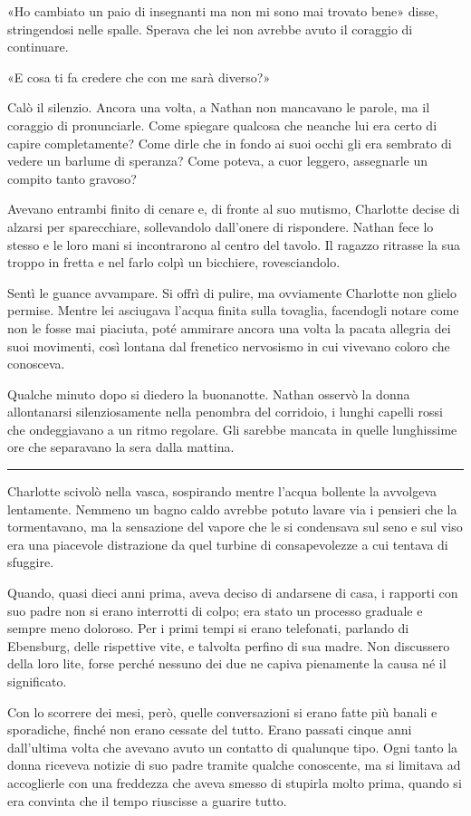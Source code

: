 «Ho cambiato un paio di insegnanti ma non mi sono mai trovato bene» disse, stringendosi nelle
spalle. Sperava che lei non avrebbe avuto il coraggio di continuare.

«E cosa ti fa credere che con me sarà diverso?»

Calò il silenzio. Ancora una volta, a Nathan non mancavano le parole, ma il coraggio di
pronunciarle. Come spiegare qualcosa che neanche lui era certo di capire completamente? Come dirle
che in fondo ai suoi occhi gli era sembrato di vedere un barlume di speranza? Come poteva, a cuor
leggero, assegnarle un compito tanto gravoso?

Avevano entrambi finito di cenare e, di fronte al suo mutismo, Charlotte decise di alzarsi per
sparecchiare, sollevandolo dall'onere di rispondere. Nathan fece lo stesso e le loro mani si
incontrarono al centro del tavolo. Il ragazzo ritrasse la sua troppo in fretta e nel farlo colpì un
bicchiere, rovesciandolo.

Sentì le guance avvampare. Si offrì di pulire, ma ovviamente Charlotte non glielo permise. Mentre
lei asciugava l'acqua finita sulla tovaglia, facendogli notare come non le fosse mai piaciuta, poté
ammirare ancora una volta la pacata allegria dei suoi movimenti, così lontana dal frenetico
nervosismo in cui vivevano coloro che conosceva.

Qualche minuto dopo si diedero la buonanotte. Nathan osservò la donna allontanarsi silenziosamente
nella penombra del corridoio, i lunghi capelli rossi che ondeggiavano a un ritmo regolare. Gli
sarebbe mancata in quelle lunghissime ore che separavano la sera dalla mattina.

\plainbreak{1}

Charlotte scivolò nella vasca, sospirando mentre l'acqua bollente la avvolgeva lentamente. Nemmeno
un bagno caldo avrebbe potuto lavare via i pensieri che la tormentavano, ma la sensazione del vapore
che le si condensava sul seno e sul viso era una piacevole distrazione da quel turbine di
consapevolezze a cui tentava di sfuggire.

Quando, quasi dieci anni prima, aveva deciso di andarsene di casa, i rapporti con suo padre non si
erano interrotti di colpo; era stato un processo graduale e sempre meno doloroso. Per i primi tempi
si erano telefonati, parlando di Ebensburg, delle rispettive vite, e talvolta perfino di sua madre.
Non discussero della loro lite, forse perché nessuno dei due ne capiva pienamente la causa né il
significato.

Con lo scorrere dei mesi, però, quelle conversazioni si erano fatte più banali e sporadiche, finché
non erano cessate del tutto. Erano passati cinque anni dall'ultima volta che avevano avuto un
contatto di qualunque tipo. Ogni tanto la donna riceveva notizie di suo padre tramite qualche
conoscente, ma si limitava ad accoglierle con una freddezza che aveva smesso di stupirla molto
prima, quando si era convinta che il tempo riuscisse a guarire tutto.

